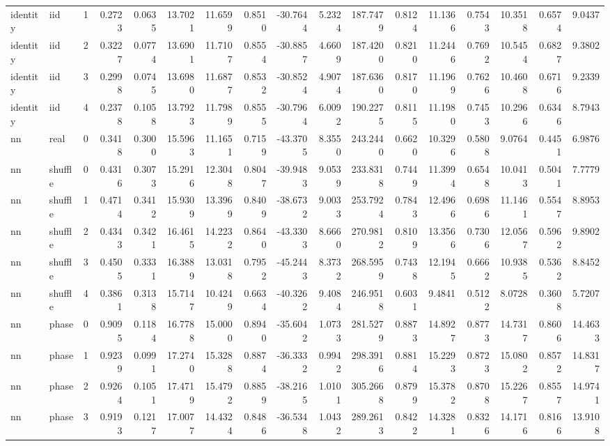 \begin{tabular}{llrrrrrrrrrrrrrrr}
identity & iid & 1 & 0.2723 & 0.0635 & 13.7021 & 11.6599 & 0.8510 & -30.7644 & 5.2324 & 187.7479 & 0.8124 & 11.1366 & 0.7543 & 10.3518 & 0.6574 & 9.0437 \\
identity & iid & 2 & 0.3227 & 0.0774 & 13.6901 & 11.7107 & 0.8554 & -30.8857 & 4.6609 & 187.4200 & 0.8210 & 11.2446 & 0.7692 & 10.5454 & 0.6827 & 9.3802 \\
identity & iid & 3 & 0.2998 & 0.0745 & 13.6980 & 11.6877 & 0.8532 & -30.8524 & 4.9074 & 187.6360 & 0.8170 & 11.1969 & 0.7626 & 10.4608 & 0.6716 & 9.2339 \\
identity & iid & 4 & 0.2378 & 0.1058 & 13.7923 & 11.7989 & 0.8555 & -30.7964 & 6.0092 & 190.2275 & 0.8115 & 11.1980 & 0.7453 & 10.2966 & 0.6346 & 8.7943 \\
nn & real & 0 & 0.3418 & 0.3000 & 15.5963 & 11.1651 & 0.7159 & -43.3705 & 8.3550 & 243.2440 & 0.6620 & 10.3296 & 0.5808 & 9.0764 & 0.4451 & 6.9876 \\
nn & shuffle & 0 & 0.4316 & 0.3073 & 15.2916 & 12.3048 & 0.8047 & -39.9483 & 9.0539 & 233.8318 & 0.7449 & 11.3994 & 0.6548 & 10.0413 & 0.5041 & 7.7779 \\
nn & shuffle & 1 & 0.4714 & 0.3412 & 15.9309 & 13.3969 & 0.8409 & -38.6732 & 9.0033 & 253.7924 & 0.7843 & 12.4966 & 0.6986 & 11.1461 & 0.5547 & 8.8953 \\
nn & shuffle & 2 & 0.4343 & 0.3421 & 16.4615 & 14.2232 & 0.8640 & -43.3303 & 8.6660 & 270.9812 & 0.8109 & 13.3566 & 0.7306 & 12.0567 & 0.5962 & 9.8902 \\
nn & shuffle & 3 & 0.4505 & 0.3331 & 16.3889 & 13.0318 & 0.7952 & -45.2443 & 8.3732 & 268.5959 & 0.7438 & 12.1945 & 0.6662 & 10.9385 & 0.5362 & 8.8452 \\
nn & shuffle & 4 & 0.3861 & 0.3138 & 15.7147 & 10.4249 & 0.6634 & -40.3262 & 9.4084 & 246.9518 & 0.6031 & 9.4841 & 0.5122 & 8.0728 & 0.3608 & 5.7207 \\
nn & phase & 0 & 0.9095 & 0.1184 & 16.7788 & 15.0000 & 0.8940 & -35.6042 & 1.0733 & 281.5279 & 0.8873 & 14.8927 & 0.8773 & 14.7317 & 0.8606 & 14.4633 \\
nn & phase & 1 & 0.9239 & 0.0991 & 17.2740 & 15.3288 & 0.8874 & -36.3332 & 0.9942 & 298.3916 & 0.8814 & 15.2293 & 0.8723 & 15.0802 & 0.8572 & 14.8317 \\
nn & phase & 2 & 0.9264 & 0.1051 & 17.4719 & 15.4792 & 0.8859 & -38.2165 & 1.0101 & 305.2668 & 0.8799 & 15.3782 & 0.8708 & 15.2267 & 0.8557 & 14.9741 \\
nn & phase & 3 & 0.9193 & 0.1217 & 17.0077 & 14.4324 & 0.8486 & -36.5348 & 1.0432 & 289.2613 & 0.8422 & 14.3281 & 0.8326 & 14.1716 & 0.8166 & 13.9108 \\

\end{tabular}

